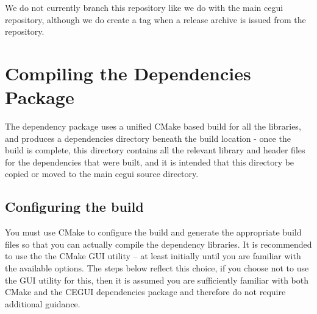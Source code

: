 We do not currently branch this repository like we do with the main cegui repository, although we do create a tag when a release archive is issued from the repository.\hypertarget{building_deps_building_deps_compilation}{}\section{Compiling the Dependencies Package}\label{building_deps_building_deps_compilation}
The dependency package uses a unified C\+Make based build for all the libraries, and produces a {\ttfamily dependencies} directory beneath the build location -\/ once the build is complete, this directory contains all the relevant library and header files for the dependencies that were built, and it is intended that this directory be copied or moved to the main cegui source directory. \hypertarget{building_deps_building_deps_compilation_configuring}{}\subsection{Configuring the build}\label{building_deps_building_deps_compilation_configuring}
You must use C\+Make to configure the build and generate the appropriate build files so that you can actually compile the dependency libraries. It is recommended to use the the C\+Make G\+UI utility -- at least initially until you are familiar with the available options. The steps below reflect this choice, if you choose not to use the G\+UI utility for this, then it is assumed you are sufficiently familiar with both C\+Make and the C\+E\+G\+UI dependencies package and therefore do not require additional guidance.


